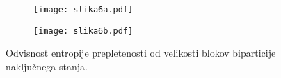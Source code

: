 \documentclass[a4paper]{article}
\begin{document}
    \begin{figure}
        \centering
        \begin{subfigure}{\textwidth}
            \texttt{[image: slika6a.pdf]}
        \end{subfigure}
        \begin{subfigure}{\textwidth}
            \texttt{[image: slika6b.pdf]}
        \end{subfigure}
        \caption{Odvisnost entropije prepletenosti od velikosti blokov biparticije naključnega stanja.}
        \label{slika6}
    \end{figure}
\end{document}

